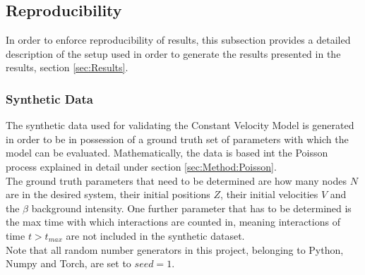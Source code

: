 \subsection{Reproducibility}
\label{sec:Method:Reproducibility}
In order to enforce reproducibility of results, this subsection provides a detailed description of the setup used in order to generate the results presented in the results, section \ref{sec:Results}.

\subsubsection{Synthetic Data}
\label{sec:Method:Reproducibility:SyntheticData}
The synthetic data used for validating the Constant Velocity Model is generated in order to be in possession of a ground truth set of parameters with which the model can be evaluated.
Mathematically, the data is based int the Poisson process explained in detail under section \ref{sec:Method:Poisson}.
\\
The ground truth parameters that need to be determined are how many nodes $N$ are in the desired system, their initial positions $Z$, their initial velocities $V$ and the $\beta$ background intensity.
One further parameter that has to be determined is the max time with which interactions are counted in, meaning interactions of time $t > t_{max}$ are not included in the synthetic dataset.
\\
Note that all random number generators in this project, belonging to Python, Numpy and Torch, are set to $seed = 1$.


